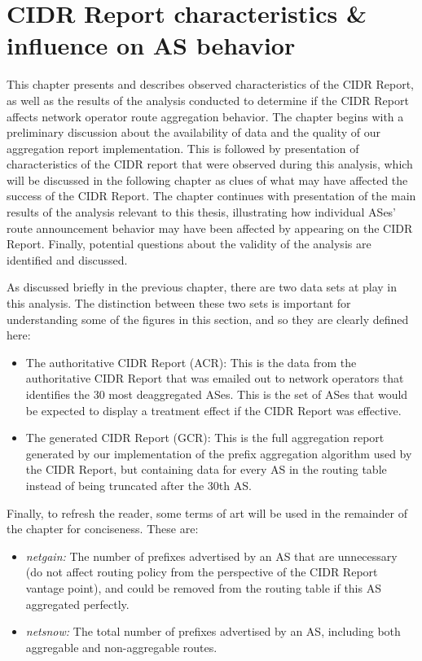 \chapter{CIDR Report characteristics \& influence on AS behavior}
\label{chap:analysis}

This chapter presents and describes observed characteristics of the CIDR
Report, as well as the results of the analysis conducted to determine if the
CIDR Report affects network operator route aggregation behavior. The chapter
begins with a preliminary discussion about the availability of data and the
quality of our aggregation report implementation. This is followed by
presentation of characteristics of the CIDR report that were observed during
this analysis, which will be discussed in the following chapter as clues of
what may have affected the success of the CIDR Report. The chapter continues
with presentation of the main results of the analysis relevant to this thesis,
illustrating how individual ASes' route announcement behavior may have been
affected by appearing on the CIDR Report. Finally, potential questions about
the validity of the analysis are identified and discussed.

As discussed briefly in the previous chapter, there are two data sets at play
in this analysis. The distinction between these two sets is important for
understanding some of the figures in this section, and so they are clearly
defined here:

\begin{itemize}

\item{The authoritative CIDR Report (ACR): This is the data from the
authoritative CIDR Report that was emailed out to network operators that
identifies the 30 most deaggregated ASes.  This is the set of ASes that would
be expected to display a treatment effect if the CIDR Report was effective.}

\item{The generated CIDR Report (GCR): This is the full aggregation report
generated by our implementation of the prefix aggregation algorithm used by the
CIDR Report, but containing data for every AS in the routing table instead of
being truncated after the 30th AS.}

\end{itemize}

Finally, to refresh the reader, some terms of art will be used in the remainder
of the chapter for conciseness. These are:

\begin{itemize}

\item{\emph{netgain:} The number of prefixes advertised by an AS that are
unnecessary (do not affect routing policy from the perspective of the CIDR
Report vantage point), and could be removed from the routing table if this AS
aggregated perfectly.}

\item{\emph{netsnow:} The total number of prefixes advertised by an AS,
including both aggregable and non-aggregable routes.}

\end{itemize}

